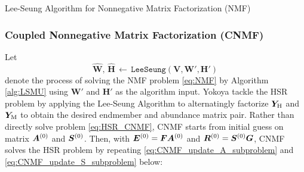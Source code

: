 \begin{algorithm}
    \caption{Lee-Seung Algorithm for Nonnegative Matrix Factorization (NMF)}
    \label{alg:LSMU}
	\begin{algorithmic}[1]
        \smallskip
            \smallskip
            \smallskip
            \smallskip
                \smallskip
                \smallskip
            \EndFor
            \smallskip
            \smallskip
            \smallskip
            \smallskip
                \smallskip
                \smallskip
            \EndFor
            \smallskip
            \smallskip
        \EndFor
        \smallskip
    \end{algorithmic}
\end{algorithm}

\subsubsection{Coupled Nonnegative Matrix Factorization (CNMF)}
Let
\[ \hat{\bm W},\,\hat{\bm H}\,\gets\,\texttt{LeeSeung}(\bm V,\bm W',\bm H')\]
denote the process of solving the NMF problem \eqref{eq:NMF} by Algorithm
\ref{alg:LSMU} using $\bm W'$ and $\bm H'$ as the algorithm input.
Yokoya \etal tackle the HSR problem by applying the Lee-Seung Algorithm to
alternatingly factorize $\bm Y_\text H$ and $\bm Y_\text M$ to obtain the desired endmember and
abundance matrix pair.
Rather than directly solve problem \eqref{eq:HSR_CNMF}, CNMF starts from
initial guess on matrix $\bm A^{(0)}$ and $\bm S^{(0)}$.
Then, with $\bm E^{(0)} = \bm F \bm A^{(0)}$ and
$\bm R^{(0)} = \bm S^{(0)} \bm G$, CNMF solves the HSR problem by repeating
\eqref{eq:CNMF_update_A_subproblem} and \eqref{eq:CNMF_update_S_subproblem}
below:

